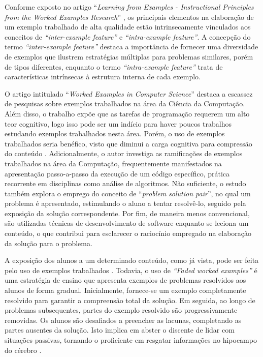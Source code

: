 Conforme exposto no artigo ``\textit{Learning from Examples - Instructional Principles from the Worked Examples Research}'' \cite{Robert.Atkinson-etal:2000}, os principais elementos na elaboração de um exemplo trabalhado de alta qualidade estão intrinsecamente vinculados aos conceitos de \textit{``inter-example feature''} e \textit{``intra-example feature''}. A concepção do termo \textit{``inter-example feature''} destaca a importância de fornecer uma diversidade de exemplos que ilustrem estratégias múltiplas para problemas similares, porém de tipos diferentes, enquanto o termo \textit{``intra-example feature''} trata de características intrínsecas à estrutura interna de cada exemplo. 

O artigo intitulado ``\textit{Worked Examples in Computer Science}'' \cite{Skudder-LuxtonReilly:2014} destaca a escassez de pesquisas sobre exemplos trabalhados na área da Ciência da Computação. Além disso, o trabalho expõe que as tarefas de programação requerem um alto teor cognitivo, logo isso pode ser um indício para haver poucos trabalhos estudando exemplos trabalhados nesta área. Porém, o uso de exemplos trabalhados seria benéfico, visto que diminui a carga cognitiva para compressão do conteúdo \cite{Robert.Atkinson-etal:2000}. Adicionalmente, o autor investiga as ramificações de exemplos trabalhados na área da Computação, frequentemente manifestados na apresentação passo-a-passo da execução de um código específico, prática recorrente em disciplinas como análise de algoritmos. Não suficiente, o estudo também explora o emprego do conceito de ``\textit{problem solution pair}'', no qual um problema é apresentado, estimulando o aluno a tentar resolvê-lo, seguido pela exposição da solução correspondente. Por fim, de maneira menos convencional, são utilizadas técnicas de desenvolvimento de software enquanto se leciona um conteúdo, o que contribui para esclarecer o raciocínio empregado na elaboração da solução para o problema.

A exposição dos alunos a um determinado conteúdo, como já vista, pode ser feita pelo uso de exemplos trabalhados \cite{Robert.Atkinson-etal:2000}. Todavia, o uso de \textit{``Faded worked examples''} é uma estratégia de ensino que apresenta exemplos de problemas resolvidos aos alunos de forma gradual. Inicialmente, fornece-se um exemplo completamente resolvido para garantir a compreensão total da solução. Em seguida, ao longo de problemas subsequentes, partes do exemplo resolvido são progressivamente removidas. Os alunos são desafiados a preencher as lacunas, completando as partes ausentes da solução. Isto implica em abster o discente de lidar com situações passivas, tornando-o proficiente em resgatar informações no hipocampo do cérebro \cite{Skudder-LuxtonReilly:2014}.

